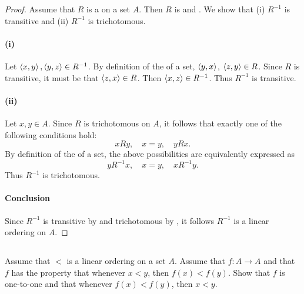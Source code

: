 \documentclass{report}
\begin{document}
  \begin{proof}

    Assume that $R$ is a  on a set $A$.
    Then $R$ is  and .
    We show that (i) $R^{-1}$ is transitive and (ii) $R^{-1}$ is trichotomous.

    \paragraph{(i)}%

      Let $\left< x, y \right>, \left< y, z \right> \in R^{-1}$.
      By definition of the  of a set,
        $\left< y, x \right>$, $\left< z, y \right> \in R$.
      Since $R$ is transitive, it must be that $\left< z, x \right> \in R$.
      Then $\left< x, z \right> \in R^{-1}$.
      Thus $R^{-1}$ is transitive.

    \paragraph{(ii)}%

      Let $x, y \in A$.
      Since $R$ is trichotomous on $A$, it follows that exactly one of the
        following conditions hold: $$xRy, \quad x = y, \quad yRx.$$
      By definition of the  of a set, the above
        possibilities are equivalently expressed as
        $$yR^{-1}x, \quad x = y, \quad xR^{-1}y.$$
      Thus $R^{-1}$ is trichotomous.

    \paragraph{Conclusion}%

      Since $R^{-1}$ is transitive by  and
        trichotomous by , it follows $R^{-1}$ is a
        linear ordering on $A$.

  \end{proof}

\subsection{}%

  Assume that $<$ is a linear ordering on a set $A$.
  Assume that $f \colon A \rightarrow A$ and that $f$ has the property that
    whenever $x < y$, then $f(x) < f(y)$.
  Show that $f$ is one-to-one and that whenever $f(x) < f(y)$, then $x < y$.
\end{document}

